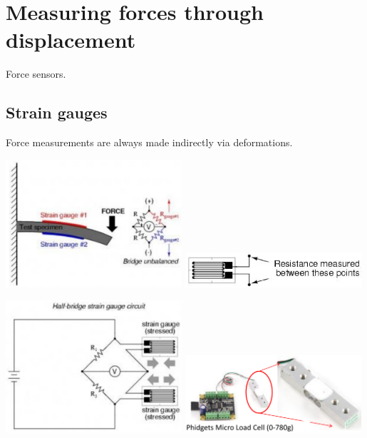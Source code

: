 \documentclass[11pt]{article}
\begin{document}
\section{Measuring forces through displacement}
\label{sec:org430b61f}
Force sensors.
\subsection{Strain gauges}
\label{sec:orgf87f071}
Force measurements are always made indirectly via deformations.

\begin{center}
\includegraphics[width=0.49\textwidth]{./images/strain-gauge-working-principle.png}
\includegraphics[width=0.49\textwidth]{./images/strain-gauge-resistance-measurement.png}
\end{center}

\begin{center}
\includegraphics[width=0.49\textwidth]{./images/half-bridge-strain-gauge-circuit.png}
\includegraphics[width=0.49\textwidth]{./images/phidgets-micro-load-cell.png}
\end{center}
\end{document}
